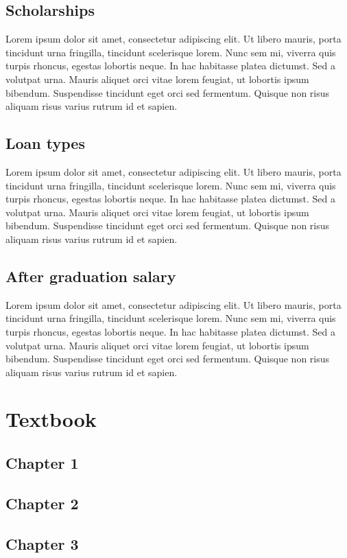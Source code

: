 \documentclass[journal]{IEEEtran}
\begin{document}
\subsection{Scholarships}
Lorem ipsum dolor sit amet, consectetur adipiscing elit. Ut libero mauris, porta tincidunt urna fringilla, tincidunt scelerisque lorem. Nunc sem mi, viverra quis turpis rhoncus, egestas lobortis neque. In hac habitasse platea dictumst. Sed a volutpat urna. Mauris aliquet orci vitae lorem feugiat, ut lobortis ipsum bibendum. Suspendisse tincidunt eget orci sed fermentum. Quisque non risus aliquam risus varius rutrum id et sapien.

\subsection{Loan types}
Lorem ipsum dolor sit amet, consectetur adipiscing elit. Ut libero mauris, porta tincidunt urna fringilla, tincidunt scelerisque lorem. Nunc sem mi, viverra quis turpis rhoncus, egestas lobortis neque. In hac habitasse platea dictumst. Sed a volutpat urna. Mauris aliquet orci vitae lorem feugiat, ut lobortis ipsum bibendum. Suspendisse tincidunt eget orci sed fermentum. Quisque non risus aliquam risus varius rutrum id et sapien.

\subsection{After graduation salary}
Lorem ipsum dolor sit amet, consectetur adipiscing elit. Ut libero mauris, porta tincidunt urna fringilla, tincidunt scelerisque lorem. Nunc sem mi, viverra quis turpis rhoncus, egestas lobortis neque. In hac habitasse platea dictumst. Sed a volutpat urna. Mauris aliquet orci vitae lorem feugiat, ut lobortis ipsum bibendum. Suspendisse tincidunt eget orci sed fermentum. Quisque non risus aliquam risus varius rutrum id et sapien.

\section{Textbook}
\subsection{Chapter 1}
\subsection{Chapter 2}
\subsection{Chapter 3}
\end{document}
